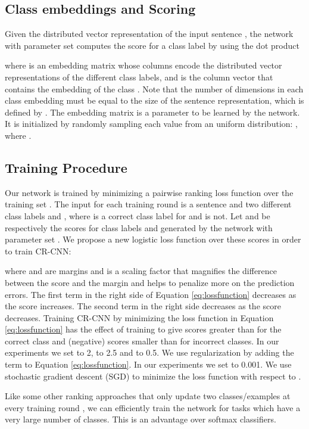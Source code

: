 \documentclass[11pt]{article}
\begin{document}
\subsection{Class embeddings and Scoring}
Given the distributed vector representation of the input sentence , 
the network with parameter set  computes the score for a class label  by using the dot product

where  is an embedding matrix whose columns encode the distributed vector representations of the different class labels, 
and  is the column vector that contains the embedding of the class .
Note that the number of dimensions in each class embedding must be equal to the size of the sentence representation,
which is defined by .
The embedding matrix  is a parameter to be learned by the network.
It is initialized by randomly sampling each value from an uniform distribution: ,
where .

\subsection{Training Procedure}
Our network is trained by minimizing a pairwise ranking loss function over the training set .
The input for each training round is a sentence  and two different class labels  and ,
where  is a correct class label for  and  is not.
Let  and  be respectively the scores for class labels  and  generated by the network with parameter set .
We propose a new logistic loss function over these scores in order to train CR-CNN:

where  and  are margins and  is a scaling factor that magnifies the difference between the score and the margin and helps to penalize more on the prediction errors.
The first term in the right side of Equation \ref{eq:lossfunction} decreases as the score  increases.
The second term in the right side decreases as the score  decreases.
Training CR-CNN by minimizing the loss function in Equation \ref{eq:lossfunction} has the effect of training to give scores greater than  for the correct class and (negative) scores smaller than  for incorrect classes.
In our experiments we set  to 2,
 to 2.5 and  to 0.5.
We use  regularization by adding the term  to Equation \ref{eq:lossfunction}.
In our experiments we set  to 0.001.
We use stochastic gradient descent (SGD) to minimize the
loss function with respect to .

Like some other ranking approaches that only update two classes/examples at every training round \cite{weston:ijcai2011,gao2014:emnlp},
we can efficiently train the network for tasks which have a very large number of classes.
This is an advantage over softmax classifiers.
\end{document}
